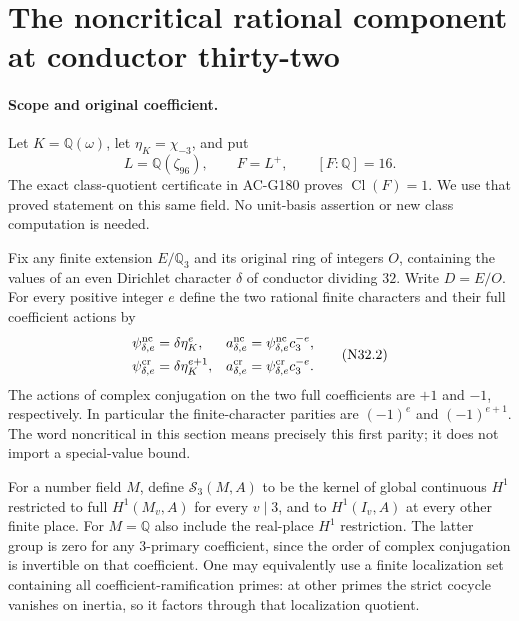 \section{The noncritical rational component at conductor thirty-two}
\label{sec:conductor32-noncritical-strict}

\paragraph{Scope and original coefficient.}
Let $K=\mathbb Q(\omega)$, let $\eta_K=\chi_{-3}$, and put
\[
 L=\mathbb Q(\zeta_{96}),\qquad F=L^+,\qquad [F:\mathbb Q]=16.
 \tag{N32.1}
\]
The exact class-quotient certificate in AC-G180 proves
$\operatorname{Cl}(F)=1$.  We use that proved statement on this
same field.  No unit-basis assertion or new class computation is needed.

Fix any finite extension $E/\mathbb Q_3$ and its original ring of
integers $O$, containing the values of an even Dirichlet character
$\delta$ of conductor dividing $32$.  Write $D=E/O$.
For every positive integer $e$ define the two rational finite characters
and their full coefficient actions by
\[
 \begin{aligned}
 \psi_{\delta,e}^{\rm nc}&=\delta\eta_K^e,
 &a_{\delta,e}^{\rm nc}&=\psi_{\delta,e}^{\rm nc}c_3^{-e},\\
 \psi_{\delta,e}^{\rm cr}&=\delta\eta_K^{e+1},
 &a_{\delta,e}^{\rm cr}&=\psi_{\delta,e}^{\rm cr}c_3^{-e}.
 \end{aligned}\tag{N32.2}
\]
The actions of complex conjugation on the two full coefficients are
$+1$ and $-1$, respectively.  In particular the finite-character
parities are $(-1)^e$ and $(-1)^{e+1}$.
The word noncritical in this section means precisely this first
parity; it does not import a special-value bound.

For a number field $M$, define $\mathcal S_3(M,A)$ to be the kernel
of global continuous $H^1$ restricted to full $H^1(M_v,A)$ for
every $v\mid3$, and to $H^1(I_v,A)$ at every other finite place.
For $M=\mathbb Q$ also include the real-place $H^1$ restriction.
The latter group is zero for any $3$-primary coefficient, since
the order of complex conjugation is invertible on that coefficient.
One may equivalently use a finite localization set containing all
coefficient-ramification primes: at other primes the strict cocycle
vanishes on inertia, so it factors through that localization quotient.

